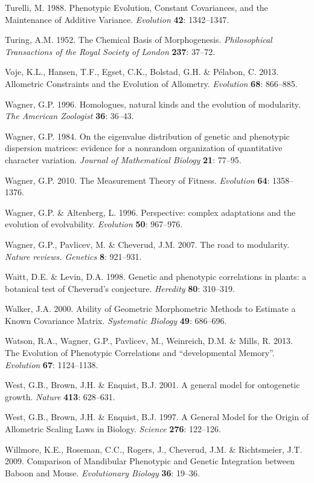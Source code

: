 \documentclass[12pt,twoside]{report}
\begin{document}
Turelli, M. 1988. Phenotypic Evolution, Constant Covariances, and the
Maintenance of Additive Variance. \emph{Evolution} \textbf{42}:
1342--1347.

Turing, A.M. 1952. The Chemical Basis of Morphogenesis.
\emph{Philosophical Transactions of the Royal Society of London}
\textbf{237}: 37--72.

Voje, K.L., Hansen, T.F., Egset, C.K., Bolstad, G.H. \& Pélabon, C.
2013. Allometric Constraints and the Evolution of Allometry.
\emph{Evolution} \textbf{68}: 866--885.

Wagner, G.P. 1996. Homologues, natural kinds and the evolution of
modularity. \emph{The American Zoologist} \textbf{36}: 36--43.

Wagner, G.P. 1984. On the eigenvalue distribution of genetic and
phenotypic dispersion matrices: evidence for a nonrandom organization of
quantitative character variation. \emph{Journal of Mathematical Biology}
\textbf{21}: 77--95.

Wagner, G.P. 2010. The Measurement Theory of Fitness. \emph{Evolution}
\textbf{64}: 1358--1376.

Wagner, G.P. \& Altenberg, L. 1996. Perspective: complex adaptations and
the evolution of evolvability. \emph{Evolution} \textbf{50}: 967--976.

Wagner, G.P., Pavlicev, M. \& Cheverud, J.M. 2007. The road to
modularity. \emph{Nature reviews. Genetics} \textbf{8}: 921--931.

Waitt, D.E. \& Levin, D.A. 1998. Genetic and phenotypic correlations in
plants: a botanical test of Cheverud's conjecture. \emph{Heredity}
\textbf{80}: 310--319.

Walker, J.A. 2000. Ability of Geometric Morphometric Methods to Estimate
a Known Covariance Matrix. \emph{Systematic Biology} \textbf{49}:
686--696.

Watson, R.A., Wagner, G.P., Pavlicev, M., Weinreich, D.M. \& Mills, R.
2013. The Evolution of Phenotypic Correlations and ``developmental
Memory''. \emph{Evolution} \textbf{67}: 1124--1138.

West, G.B., Brown, J.H. \& Enquist, B.J. 2001. A general model for
ontogenetic growth. \emph{Nature} \textbf{413}: 628--631.

West, G.B., Brown, J.H. \& Enquist, B.J. 1997. A General Model for the
Origin of Allometric Scaling Laws in Biology. \emph{Science}
\textbf{276}: 122--126.

Willmore, K.E., Roseman, C.C., Rogers, J., Cheverud, J.M. \&
Richtsmeier, J.T. 2009. Comparison of Mandibular Phenotypic and Genetic
Integration between Baboon and Mouse. \emph{Evolutionary Biology}
\textbf{36}: 19--36.
\end{document}
